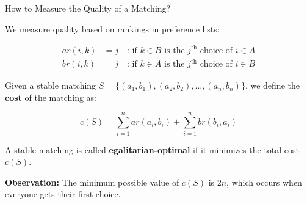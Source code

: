 \documentclass[aspectratio=169,xcolor=dvipsnames]{beamer}
\begin{document}
\begin{frame}{How to Measure the Quality of a Matching?}

We measure quality based on rankings in preference lists:

\[
\begin{aligned}
    ar(i, k) &= j \quad \text{: if } k \in B \text{ is the } j^{\text{th}} \text{ choice of } i \in A \\
    br(i, k) &= j \quad \text{: if } k \in A \text{ is the } j^{\text{th}} \text{ choice of } i \in B
\end{aligned}
\]

\pause
Given a stable matching \( S = \{(a_1, b_1), (a_2, b_2), \ldots, (a_n, b_n)\} \), we define the \textbf{cost} of the matching as:

\[
c(S) = \sum_{i=1}^{n} ar(a_i, b_i) + \sum_{i=1}^{n} br(b_i, a_i)
\]

\pause
A stable matching is called \textbf{egalitarian-optimal} if it minimizes the total cost \( c(S) \).

\medskip
\textbf{Observation:} The minimum possible value of \( c(S) \) is \( 2n \), which occurs when everyone gets their first choice.
\end{frame}
\end{document}

